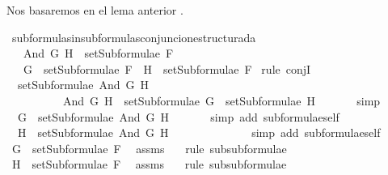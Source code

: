 \begin{isabellebody}
\begin{isamarkuptext}
  Nos basaremos en el lema anterior .%
\end{isamarkuptext}\isamarkuptrue%
\isamarkupfalse%
\ subformulas{\isacharunderscore}in{\isacharunderscore}subformulas{\isacharunderscore}conjuncion{\isacharunderscore}estructurada{\isacharcolon}\isanewline
\ \ \ {\isachardoublequoteopen}And\ G\ H\ {\isasymin}\ setSubformulae\ F{\isachardoublequoteclose}\ \isanewline
\ \ \ {\isachardoublequoteopen}G\ {\isasymin}\ setSubformulae\ F\ {\isasymand}\ H\ {\isasymin}\ setSubformulae\ F{\isachardoublequoteclose}\isanewline
%
\isadelimproof
%
\endisadelimproof
%
\isatagproof
{}\isamarkupfalse%
\ {\isacharparenleft}rule\ conjI{\isacharparenright}\isanewline
\ \ \isamarkupfalse%
\ {}{\isacharcolon}\ {\isachardoublequoteopen}setSubformulae\ {\isacharparenleft}And\ G\ H{\isacharparenright}\ {\isacharequal}\ \isanewline
\ \ \ \ \ \ \ \ \ \ {\isacharbraceleft}And\ G\ H{\isacharbraceright}\ {\isasymunion}\ setSubformulae\ G\ {\isasymunion}\ setSubformulae\ H{\isachardoublequoteclose}\ \isanewline
\ \ \ \ \isamarkupfalse%
\ simp\isanewline
\ \ \isamarkupfalse%
\ \isamarkupfalse%
\ {}{\isacharcolon}\ {\isachardoublequoteopen}G\ {\isasymin}\ setSubformulae\ {\isacharparenleft}And\ G\ H{\isacharparenright}{\isachardoublequoteclose}\ \isanewline
\ \ \ \ \isamarkupfalse%
\ {\isacharparenleft}simp\ add{\isacharcolon}\ subformulae{\isacharunderscore}self{\isacharparenright}\ \isanewline
\ \ \isamarkupfalse%
\ {}{\isacharcolon}\ {\isachardoublequoteopen}H\ {\isasymin}\ setSubformulae\ {\isacharparenleft}And\ G\ H{\isacharparenright}{\isachardoublequoteclose}\ \isanewline
\ \ \ \ \isamarkupfalse%
\ {}\ \isanewline
\ \ \ \ \isamarkupfalse%
\ {\isacharparenleft}simp\ add{\isacharcolon}\ subformulae{\isacharunderscore}self{\isacharparenright}\ \isanewline
\ \ \isamarkupfalse%
\ {\isachardoublequoteopen}G\ {\isasymin}\ setSubformulae\ F{\isachardoublequoteclose}\ \isamarkupfalse%
\ assms\ {}\ \isamarkupfalse%
\ {\isacharparenleft}rule\ subsubformulae{\isacharparenright}\isanewline
\ \ \isamarkupfalse%
\ {\isachardoublequoteopen}H\ {\isasymin}\ setSubformulae\ F{\isachardoublequoteclose}\ \isamarkupfalse%
\ assms\ {}\ \isamarkupfalse%
\ {\isacharparenleft}rule\ subsubformulae{\isacharparenright}\isanewline

\end{isabellebody}
